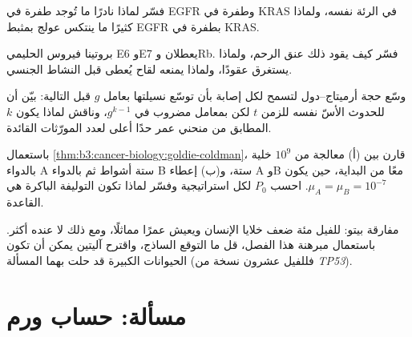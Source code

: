 \begin{exercise}[$\star\star$]\label{exo:b3:cancer-biology:8}
فسّر لماذا نادرًا ما تُوجد طفرة في EGFR وطفرة في KRAS
في  الرئة نفسه، ولماذا كثيرًا ما ينتكس  عولج بمثبط
EGFR بطفرة في KRAS.
\end{exercise}

\begin{exercise}[$\star\star$]\label{exo:b3:cancer-biology:9}
بروتينا فيروس  الحليمي E6 وE7 يعطلان  وRb. فسّر
كيف يقود ذلك  عنق الرحم، ولماذا يستغرق عقودًا، ولماذا
يمنعه لقاح يُعطى قبل النشاط الجنسي.
\end{exercise}

\begin{exercise}[$\star\star\star$]\label{exo:b3:cancer-biology:10}
وسّع حجة أرميتاج--دول لتسمح لكل إصابة بأن توسّع
نسيلتها بعامل $g$ قبل التالية: بيّن أن للحدوث الأسّ
نفسه للزمن $t$ لكن بمعامل مضروب في $g^{k-1}$، وناقش
لماذا يكون $k$ المطابق من منحني عمر حدًا أعلى لعدد
المورّثات القائدة.
\end{exercise}

\begin{exercise}[$\star\star\star$]\label{exo:b3:cancer-biology:11}
باستعمال \cref{thm:b3:cancer-biology:goldie-coldman}، قارن بين (أ) معالجة
 من $10^{9}$ خلية بالدواء A ستة أشواط ثم بالدواء B ستة،
و(ب) إعطاء A وB معًا من البداية، حين يكون $\mu_{A} =
\mu_{B} = 10^{-7}$. احسب $P_{0}$ لكل استراتيجية وفسّر لماذا
تكون التوليفة الباكرة هي القاعدة.
\end{exercise}

\begin{exercise}[$\star\star\star$]\label{exo:b3:cancer-biology:12}
مفارقة بيتو: للفيل مئة ضعف خلايا
الإنسان ويعيش عمرًا مماثلًا، ومع ذلك لا  عنده أكثر. باستعمال مبرهنة
هذا الفصل، قل ما التوقع الساذج، واقترح آليتين
يمكن أن تكون الحيوانات الكبيرة قد حلت بهما المسألة (فللفيل
عشرون نسخة من \emph{TP53}).
\end{exercise}

\section{مسألة: حساب ورم}

